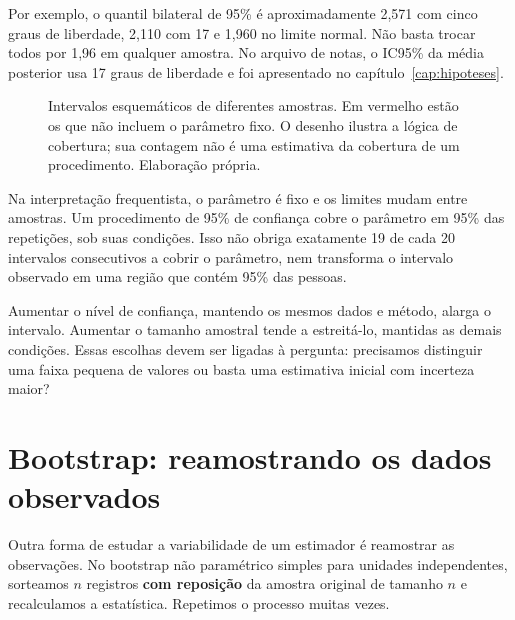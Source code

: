 Por exemplo, o quantil bilateral de 95\% é aproximadamente 2,571 com cinco graus de liberdade, 2,110 com 17 e 1,960 no limite normal. Não basta trocar todos por 1,96 em qualquer amostra. No arquivo de notas, o IC95\% da média posterior usa 17 graus de liberdade e foi apresentado no capítulo~\ref{cap:hipoteses}.

\begin{figure}[H]
\centering
{}
\caption{Intervalos esquemáticos de diferentes amostras. Em vermelho estão os que não incluem o parâmetro fixo. O desenho ilustra a lógica de cobertura; sua contagem não é uma estimativa da cobertura de um procedimento. Elaboração própria.}
\label{fig:cobertura-intervalos}
\end{figure}

Na interpretação frequentista, o parâmetro é fixo e os limites mudam entre amostras. Um procedimento de 95\% de confiança cobre o parâmetro em 95\% das repetições, sob suas condições. Isso não obriga exatamente 19 de cada 20 intervalos consecutivos a cobrir o parâmetro, nem transforma o intervalo observado em uma região que contém 95\% das pessoas.

Aumentar o nível de confiança, mantendo os mesmos dados e método, alarga o intervalo. Aumentar o tamanho amostral tende a estreitá-lo, mantidas as demais condições. Essas escolhas devem ser ligadas à pergunta: precisamos distinguir uma faixa pequena de valores ou basta uma estimativa inicial com incerteza maior?

\section{Bootstrap: reamostrando os dados observados}

Outra forma de estudar a variabilidade de um estimador é reamostrar as observações. No bootstrap não paramétrico simples para unidades independentes, sorteamos $n$ registros \textbf{com reposição} da amostra original de tamanho $n$ e recalculamos a estatística. Repetimos o processo muitas vezes.

